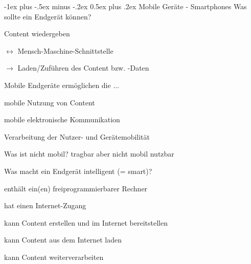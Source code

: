 \documentclass[a4paper, 8pt]{article}
\makeatletter
\renewcommand{\section}{\@startsection{section}{1}{0mm}%
                                {-1ex plus -.5ex minus -.2ex}%
                                {0.5ex plus .2ex}%
                                {\normalfont\large\bfseries}}
\makeatother
\begin{document}
\begin{multicols*}{2}
  \setlength{\premulticols}{1pt}
  \setlength{\postmulticols}{1pt}
  \setlength{\multicolsep}{1pt}
  \setlength{\columnsep}{2pt}
  \raggedright

  \section{Mobile Geräte - Smartphones}
  Was sollte ein Endgerät können?
  \begin{itemize*}
    \item Content wiedergeben
    \item $\leftrightarrow$ Mensch-Maschine-Schnittstelle
    \item $\rightarrow$ Laden/Zuführen des Content bzw. -Daten
  \end{itemize*}

  \begin{itemize*}
    \item Mobile Endgeräte ermöglichen die ...
    \begin{itemize*}
      \item mobile Nutzung von Content
      \item mobile elektronische Kommunikation
      \item Verarbeitung der Nutzer- und Gerätemobilität
    \end{itemize*}
    \item Was ist nicht mobil? tragbar aber nicht mobil nutzbar
  \end{itemize*}

  Was macht ein Endgerät intelligent (= smart)?
  \begin{itemize*}
    \item enthält ein(en) freiprogrammierbarer Rechner
    \item hat einen Internet-Zugang
    \item kann Content erstellen und im Internet bereitstellen
    \item kann Content aus dem Internet laden
    \item kann Content weiterverarbeiten
  \end{itemize*}


\end{multicols*}
\end{document}
